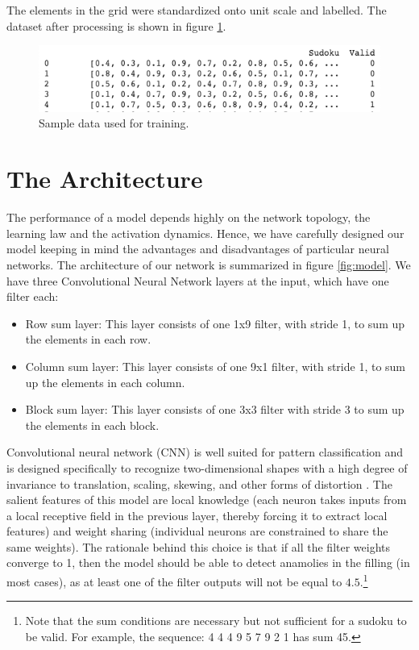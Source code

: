 \documentclass[twoside]{article}
\begin{document}
The elements in the grid were standardized onto unit scale and labelled. The dataset after processing is shown in figure \ref{fig:data}.
\begin{figure}
  \centering
  \includegraphics[width=\textwidth]{sample_data.png}
  \caption{Sample data used for training.}
  \label{fig:data}
\end{figure}

\section{The Architecture}
The performance of a model depends highly on the network topology, the learning law and the activation dynamics. Hence, we have carefully designed our model keeping in mind the advantages and disadvantages of particular neural networks. The architecture of our network is summarized in figure \ref{fig:model}. We have three Convolutional Neural Network layers at the input, which have one filter each:
\begin{itemize}
	\item Row sum layer: This layer consists of one 1x9 filter, with stride 1, to sum up the elements in each row. 
	\item Column sum layer: This layer consists of one 9x1 filter, with stride 1, to sum up the elements in each column.
	\item Block sum layer: This layer consists of one 3x3 filter with stride 3 to sum up the elements in each block.
\end{itemize}
 Convolutional neural network (CNN) is well suited for pattern classification and is designed specifically to recognize two-dimensional shapes with a high degree of invariance to translation, scaling, skewing, and other forms of distortion \cite{haykin}. The salient features of this model are local knowledge (each neuron takes inputs from a local receptive field in the previous layer, thereby forcing it to extract local features) and weight sharing (individual neurons are constrained to share the same weights).
The rationale behind this choice is that if all the filter weights converge to 1, then the model should be able to detect anamolies in the filling (in most cases), as at least one of the filter outputs will not be equal to $4.5$.\footnote{Note that the sum conditions are necessary but not sufficient for a sudoku to be valid. For example, the sequence: 4 4 4 9 5 7 9 2 1 has sum 45.}\\
\end{document}
